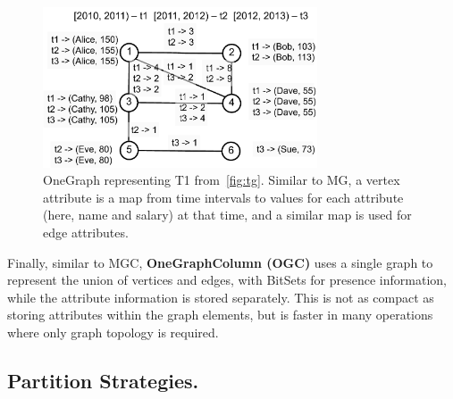 \begin{figure}[t!]
\includegraphics[width=3.2in]{figs/og.pdf}
\caption{OneGraph representing T1 from~\ref{fig:tg}.  Similar to MG, a
  vertex attribute is a map from time intervals to values for each
  attribute (here, name and salary) at that time, and a similar map is
  used for edge attributes.}
\label{fig:og}
\end{figure}

Finally, similar to MGC, {\bf OneGraphColumn (OGC)} uses a single
graph to represent the union of vertices and edges, with BitSets for
presence information, while the attribute information is stored
separately.  This is not as compact as storing attributes within the
graph elements, but is faster in many operations where only graph
topology is required.

\subsection{Partition Strategies.}  

